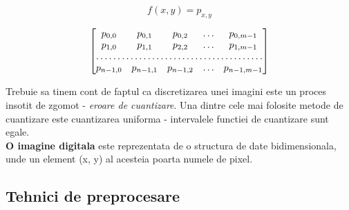 \documentclass[10pt]{article}
\begin{document}
\begin{equation}\label{eq:3}
	f(x,y) = p_{x,y}
\end{equation}

\[
\begin{bmatrix}
    p_{0,0}       & p_{0,1} & p_{0,2} & \dots & p_{0,m-1} \\
    p_{1,0}       & p_{1,1} & p_{2,2} & \dots & p_{1,m-1} \\
    \hdotsfor{5} \\
    p_{n-1,0}       & p_{n-1,1} & p_{n-1,2} & \dots & p_{n-1,m-1}
\end{bmatrix}
\]

\> Trebuie sa tinem cont de faptul ca discretizarea unei imagini este un proces insotit de zgomot - {\it eroare de cuantizare}.
Una dintre cele mai folosite metode de cuantizare este cuantizarea uniforma - intervalele
functiei de cuantizare sunt egale. \\

\> {\bf O imagine digitala} este reprezentata de o structura de date bidimensionala, unde un
element (x, y) al acesteia poarta numele de pixel.

\newpage

\subsection{Tehnici de preprocesare}
\end{document}
